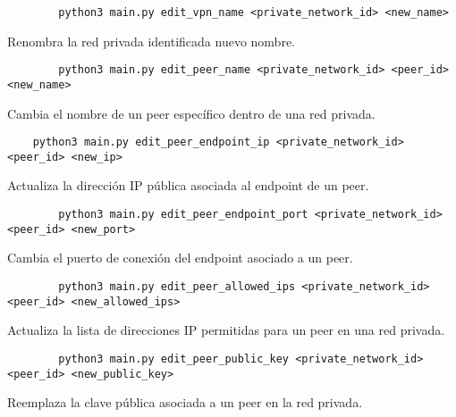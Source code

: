     \begin{verbatim}
        python3 main.py edit_vpn_name <private_network_id> <new_name>
    \end{verbatim}
    Renombra la red privada identificada nuevo nombre.
    
    \begin{verbatim}
        python3 main.py edit_peer_name <private_network_id> <peer_id> <new_name>
    \end{verbatim}
    Cambia el nombre de un peer específico dentro de una red privada.
    
    \begin{verbatim}
    python3 main.py edit_peer_endpoint_ip <private_network_id> <peer_id> <new_ip>
    \end{verbatim}
    Actualiza la dirección IP pública asociada al endpoint de un peer.
    
    \begin{verbatim}
        python3 main.py edit_peer_endpoint_port <private_network_id> <peer_id> <new_port>
    \end{verbatim}
    Cambia el puerto de conexión del endpoint asociado a un peer.
    
    \begin{verbatim}
        python3 main.py edit_peer_allowed_ips <private_network_id> <peer_id> <new_allowed_ips>
    \end{verbatim}
    Actualiza la lista de direcciones IP permitidas para un peer en una red privada.
    
    \begin{verbatim}
        python3 main.py edit_peer_public_key <private_network_id> <peer_id> <new_public_key>
    \end{verbatim}
    Reemplaza la clave pública asociada a un peer en la red privada.
    